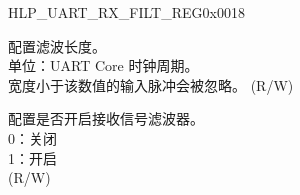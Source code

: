 \begin{register}{H}{LP\_UART\_RX\_FILT\_REG}{0x0018}\label{regdesc:LPUARTRXFILTREG}
%
%
%
\regnewline%
\begin{regdesc}\begin{reglist}
\label{fielddesc:LPUARTGLITCHFILT}\item [LP\_UART\_GLITCH\_FILT] 配置滤波长度。\\单位：UART Core 时钟周期。\\宽度小于该数值的输入脉冲会被忽略。 (R/W)
\label{fielddesc:LPUARTGLITCHFILTEN}\item [LP\_UART\_GLITCH\_FILT\_EN] 配置是否开启接收信号滤波器。\\
0：关闭\\
1：开启\\ (R/W)
\end{reglist}\end{regdesc}
\end{register}


